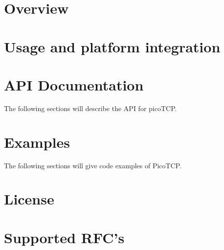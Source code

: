 \chapter{Overview}
\label{chap:overview}



\chapter{Usage and platform integration}
\label{chap:usage}



\chapter{API Documentation}
\label{chap:api_doc}
The following sections will describe the API for picoTCP.








\chapter{Examples}
\label{chap:examples}
The following sections will give code examples of PicoTCP.



\appendix

\chapter{License}
\label{chap:license}


\chapter{Supported RFC's}
\label{chap:rfcs}



